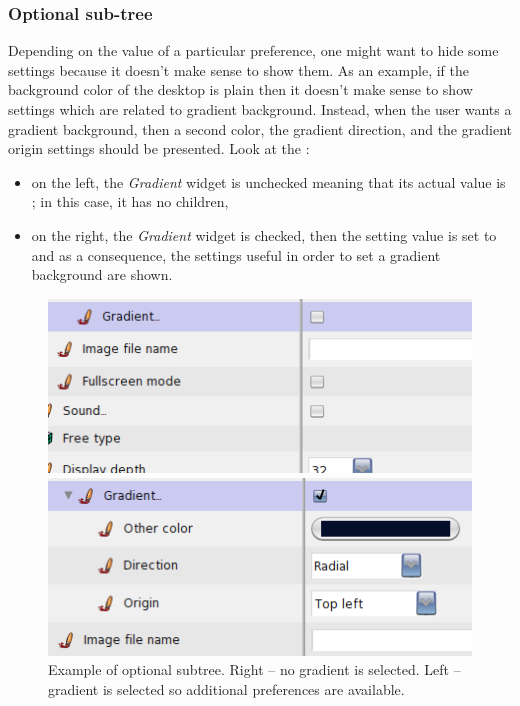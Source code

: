 \documentclass[a4paper,10pt,twoside]{book}
\begin{document}
\subsubsection{Optional sub-tree}
Depending on the value of a particular preference, one might want to hide some settings because it doesn't make sense to show them. As an example, if the background color of the desktop is plain then it doesn't make sense to show settings which are related to gradient background. Instead, when the user wants a gradient background, then a second color, the gradient direction, and the gradient origin settings should be presented. 
Look at the :
\begin{itemize}
\item on the left, the \textit{Gradient} widget is unchecked meaning that its actual value is ; in this case, it has no children, 
\item on the right, the \textit{Gradient} widget is checked, then the setting value is set to  and as a consequence, the settings useful in order to set a gradient background are shown.
\end{itemize}
\begin{figure}[tbh]
\begin{center}
\begin{minipage}[t]{0.49\linewidth}
\includegraphics[scale=0.35]{smart-subtree1}
\end{minipage}
\begin{minipage}[t]{0.49\linewidth}
\includegraphics[scale=0.35]{smart-subtree2}
\end{minipage}
\caption{Example of optional subtree. Right -- no gradient is selected. Left -- gradient is selected so additional preferences are available.}
\end{center}
\end{figure}
\end{document}
